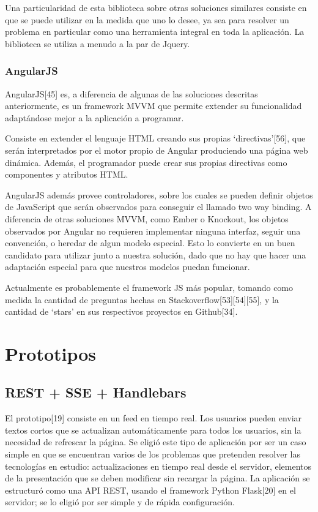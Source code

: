\documentclass[doc,helv,longtable]{article}
\begin{document}
Una particularidad de esta biblioteca sobre otras soluciones similares consiste en que se puede utilizar en la medida que uno lo desee, ya sea para resolver un problema en particular como una herramienta integral en toda la aplicación. La biblioteca se utiliza a menudo a la par de Jquery. 

\subsubsection{AngularJS}
AngularJS[45] es, a diferencia de algunas de las soluciones descritas anteriormente, es un framework MVVM que permite extender su funcionalidad adaptándose mejor a la aplicación a programar. 

Consiste en extender el lenguaje HTML creando sus propias ‘directivas’[56], que serán interpretados por el motor propio de Angular produciendo una página web dinámica. Además, el programador puede crear sus propias directivas como componentes y atributos HTML.

AngularJS además provee controladores, sobre los cuales se pueden definir objetos de JavaScript que serán observados para conseguir el llamado two way binding. A diferencia de otras soluciones MVVM, como Ember o Knockout, los objetos observados por Angular no requieren implementar ninguna interfaz, seguir una convención, o heredar de algun modelo especial. Esto lo convierte en un buen candidato para utilizar junto a nuestra solución, dado que no hay que hacer una adaptación especial para que nuestros modelos puedan funcionar. 

Actualmente es probablemente el framework JS más popular, tomando como medida la cantidad de preguntas hechas en Stackoverflow[53][54][55], y la cantidad de ‘stars’ en sus respectivos proyectos en Github[34].

\section{Prototipos}
\subsection{REST + SSE + Handlebars}
El prototipo[19] consiste en un feed en tiempo real. Los usuarios pueden enviar textos cortos que se actualizan automáticamente para todos los usuarios, sin la necesidad de refrescar la página. Se eligió este tipo de aplicación por ser un caso simple en que se encuentran varios de los problemas que pretenden resolver las tecnologías en estudio: actualizaciones en tiempo real desde el servidor, elementos de la presentación que se deben modificar sin recargar la página. La aplicación se estructuró como una API REST, usando el framework Python Flask[20] en el servidor; se lo eligió por ser simple y de rápida configuración. 
\end{document}
